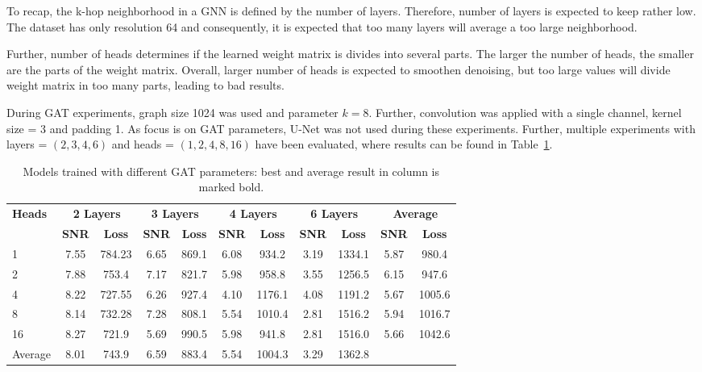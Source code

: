 To recap, the k-hop neighborhood in a GNN is defined by the number of layers.
Therefore, number of layers is expected to keep rather low. The dataset has only resolution 64
and consequently, it is expected that too many layers will average a too large neighborhood.

Further, number of heads determines if the learned weight matrix is divides into several parts.
The larger the number of heads, the smaller are the parts of the weight matrix.
Overall, larger number of heads is expected to smoothen denoising, but too large values
will divide weight matrix in too many parts, leading to bad results.

During GAT experiments, graph size 1024 was used and parameter $k=8$.
Further, convolution was applied with a single channel, kernel size = 3 and padding 1.
As focus is on GAT parameters, U-Net was not used during these experiments.
Further, multiple experiments with layers = $(2,3,4,6)$ and heads = $(1,2,4,8,16)$ have been evaluated, 
where results can be found in Table~\ref{tab:small_gat_results}.

\begin{table}[H]
  \centering
  \begin{tabular}{l|cc|cc|cc|cc|cc}
    \toprule
    \textbf{Heads} & \multicolumn{2}{c|}{\footnotesize \textbf{2 Layers}} & \multicolumn{2}{c|}{\footnotesize \textbf{3 Layers}} & \multicolumn{2}{c|}{\footnotesize \textbf{4 Layers}} & \multicolumn{2}{c|}{\footnotesize \textbf{6 Layers}} & \multicolumn{2}{c}{\footnotesize \textbf{Average}} \\
                   & \textbf{SNR} & \textbf{Loss} & \textbf{SNR} & \textbf{Loss} & \textbf{SNR} & \textbf{Loss} & \textbf{SNR} & \textbf{Loss} & \textbf{SNR} & \textbf{Loss} \\ 
    \midrule
    1    &  7.55	& 784.23 & 6.65	& 869.1  & 6.08	& 934.2  & 3.19	& 1334.1 & 5.87 & 980.4 \\ \hline
    2    &  7.88	& 753.4  & 7.17	& 821.7  & 5.98	& 958.8  & 3.55	& 1256.5 & 6.15 & 947.6 \\ \hline
    4    &  8.22	& 727.55 & 6.26	& 927.4  & 4.10	& 1176.1 & 4.08	& 1191.2 & 5.67 & 1005.6 \\ \hline
    8    &  8.14 	& 732.28 & 7.28	& 808.1  & 5.54	& 1010.4 & 2.81	& 1516.2 & 5.94 & 1016.7 \\ \hline
    16   &  8.27  & 721.9  & 5.69	& 990.5  & 5.98	& 941.8  & 2.81	& 1516.0 & 5.66 & 1042.6 \\ \hline
    
    Average  &  8.01 & 743.9 & 6.59 & 883.4 & 5.54 & 1004.3 & 3.29 & 1362.8   \\ 
    \midrule
  \end{tabular}
  \caption{Models trained with different GAT parameters: best and average result in column is marked bold. }
  \label{tab:small_gat_results}
\end{table}



